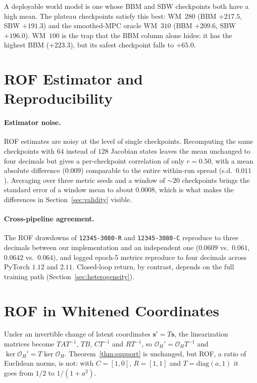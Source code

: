 \documentclass[11pt]{article}
\theoremstyle{remark}
\begin{document}
A deployable world model is one whose BBM and SBW checkpoints both have a high mean. The plateau checkpoints satisfy this best: WM~$280$ (BBM $+217.5$, SBW $+191.3$) and the smoothed-MPC oracle WM~$310$ (BBM $+209.6$, SBW $+196.0$). WM~$100$ is the trap that the BBM column alone hides: it has the highest BBM ($+223.3$), but its safest checkpoint falls to $+65.0$.

\section{ROF Estimator and Reproducibility}
\label{sec:app-repro}

\paragraph{Estimator noise.} ROF estimates are noisy at the level of single checkpoints. Recomputing the same checkpoints with $64$ instead of $128$ Jacobian states leaves the mean unchanged to four decimals but gives a per-checkpoint correlation of only $r{=}0.50$, with a mean absolute difference ($0.009$) comparable to the entire within-run spread (s.d.\ $0.011$). Averaging over three metric seeds and a window of ${\sim}20$ checkpoints brings the standard error of a window mean to about $0.0008$, which is what makes the differences in Section~\ref{sec:validity} visible.

\paragraph{Cross-pipeline agreement.} The ROF drawdowns of \texttt{12345-3080-R} and \texttt{12345-3080-C} reproduce to three decimals between our implementation and an independent one ($0.0609$ vs.\ $0.061$, $0.0642$ vs.\ $0.064$), and logged epoch-5 metrics reproduce to four decimals across PyTorch $1.12$ and $2.11$. Closed-loop return, by contrast, depends on the full training path (Section~\ref{sec:heterogeneity}).

\section{ROF in Whitened Coordinates}
\label{sec:app-coords}

Under an invertible change of latent coordinates $\bm{s}' = T\bm{s}$, the linearization matrices become $TAT^{-1}$, $TB$, $CT^{-1}$ and $RT^{-1}$, so $\mathcal{O}_H' = \mathcal{O}_H T^{-1}$ and $\ker \mathcal{O}_H' = T \ker \mathcal{O}_H$. Theorem~\ref{thm:support} is unchanged, but ROF, a ratio of Euclidean norms, is not: with $C = [1, 0]$, $R = [1, 1]$ and $T = \mathrm{diag}(a, 1)$ it goes from $1/2$ to $1/(1+a^2)$.
\end{document}
